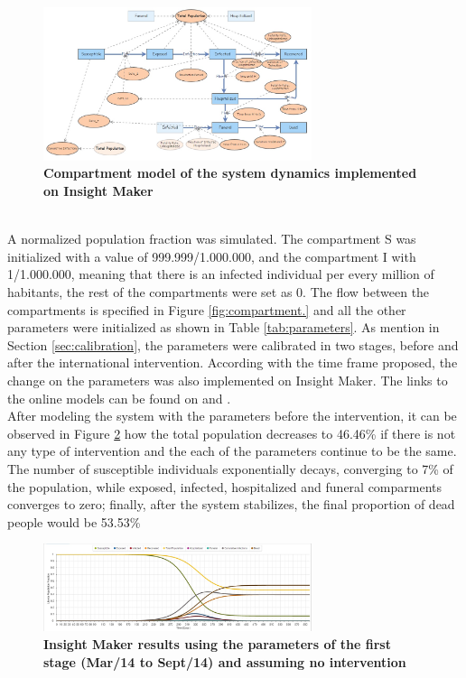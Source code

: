\documentclass[10pt]{article}
\begin{document}
\begin{figure}[!h]
  \centering
  \includegraphics[width=0.7\textwidth]{SD_IM}
  \caption{ \bf Compartment model of the system dynamics implemented on Insight Maker}
\label{fig:SD_IM} 
\end{figure}\\

\noindent A normalized population fraction was simulated. The compartment S was initialized with a value of 999.999/1.000.000, and the compartment I with 1/1.000.000, meaning that there is an infected individual per every million of habitants, the rest of the compartments were set as 0. The flow between the compartments is specified in Figure \ref{fig:compartment.} and all the other parameters were initialized as shown in Table \ref{tab:parameters}.  As mention in Section \ref{sec:calibration}, the parameters were calibrated in two stages, before and after the international intervention. According with the time frame proposed, the change on the parameters was also implemented on Insight Maker. The links to the online models can be found on \cite{IM_AI} and  \cite{IM_BI}.  \\


%
\noindent After modeling the system with the parameters before the intervention, it can be observed in Figure \ref{fig:LB_IM_NoIn} how the total population decreases to 46.46\%  if there is not any type of intervention and the each of the parameters continue to be the same. The number of susceptible individuals exponentially decays, converging to 7\% of the population, while exposed, infected, hospitalized and funeral comparments converges to zero; finally, after the system stabilizes, the final proportion of dead people would be 53.53\% \\

\begin{figure}[!h]
  \centering
  \includegraphics[width=0.7\textwidth]{LB_NoInt_SD_IM}
  \caption{ \bf Insight Maker results using the parameters of the first stage (Mar/14 to Sept/14) and assuming no intervention}
\label{fig:LB_IM_NoIn} 
\end{figure}\\
\end{document}
